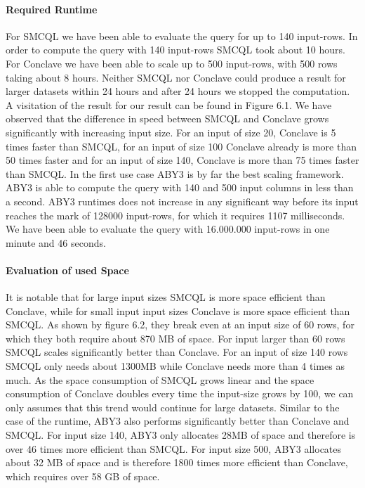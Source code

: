 \paragraph{Required Runtime}
For SMCQL we have been able to evaluate the query for up to 140 input-rows. In order to compute the query with 140 input-rows SMCQL took about 10 hours. For Conclave we have been able to scale up to 500 input-rows, with 500 rows taking about 8 hours. Neither SMCQL nor Conclave could produce a result for larger datasets within 24 hours and after 24 hours we stopped the computation. A visitation of the result for our result can be found in Figure 6.1.
We have observed that the difference in speed between SMCQL and Conclave grows significantly with increasing input size. For an input of size 20, Conclave is 5 times faster than SMCQL, for an input of size 100 Conclave already is more than 50 times faster and for an input of size 140, Conclave is more than 75 times faster than SMCQL. In the first use case ABY3 is by far the best scaling framework. ABY3 is able to compute the query with 140 and 500 input columns in less than a second. ABY3 runtimes does not increase in any significant way before its input reaches the mark of 128000 input-rows, for which it requires 1107 milliseconds. We have been able to evaluate the query with 16.000.000 input-rows in one minute and 46 seconds. 
\paragraph{Evaluation of used Space}
It is notable that for large input sizes SMCQL is more space efficient than Conclave, while for small input input sizes Conclave is more space efficient than SMCQL. As shown by figure 6.2, they break even at an input size of 60 rows, for which they both require about 870 MB of space.  For input larger than 60 rows SMCQL scales significantly better than Conclave. For an input of size 140 rows SMCQL only needs about 1300MB while Conclave needs more than 4 times as much. As the space consumption of SMCQL grows linear and the space consumption of Conclave doubles every time the input-size grows by 100, we can only assumes that this trend would continue for large datasets. Similar to the case of the runtime, ABY3 also performs significantly better than Conclave and SMCQL. For input size 140, ABY3 only allocates 28MB of space and therefore is over 46 times more efficient than SMCQL. For input size 500, ABY3 allocates about 32 MB of space and is therefore 1800 times more efficient than Conclave, which requires over 58 GB of space.          



